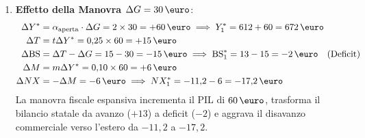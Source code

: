 \begin{esercizio}
\begin{enumerate}
    \item \textbf{Effetto della Manovra $\Delta G = 30\,\text{\euro}$}:
    \begin{align*}
        \Delta Y^* &= \alpha_{\text{aperta}} \cdot \Delta G = 2 \times 30 = +60\,\text{\euro} \implies Y_1^* = 612 + 60 = 672\,\text{\euro} \\
        \Delta T &= t \Delta Y^* = 0{,}25 \times 60 = +15\,\text{\euro} \\
        \Delta \mathrm{BS} &= \Delta T - \Delta G = 15 - 30 = -15\,\text{\euro} \implies \mathrm{BS}_1^* = 13 - 15 = -2\,\text{\euro} \quad (\text{Deficit}) \\
        \Delta M &= m \Delta Y^* = 0{,}10 \times 60 = +6\,\text{\euro} \\
        \Delta NX &= -\Delta M = -6\,\text{\euro} \implies NX_1^* = -11{,}2 - 6 = -17{,}2\,\text{\euro}
    \end{align*}
    La manovra fiscale espansiva incrementa il PIL di $60\,\text{\euro}$, trasforma il bilancio statale da avanzo ($+13$) a deficit ($-2$) e aggrava il disavanzo commerciale verso l'estero da $-11{,}2$ a $-17{,}2$.
\end{enumerate}
\end{esercizio}
